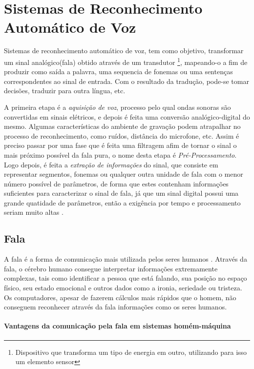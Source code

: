 \chapter{Sistemas de Reconhecimento Automático de Voz}

Sistemas de reconhecimento automático de voz, tem como objetivo, transformar um sinal analógico(fala) obtido através de um transdutor \footnote{Dispositivo que transforma um tipo de energia em outro, utilizando para isso um elemento sensor}, mapeando-o a fim de produzir como saída a palavra, uma sequencia de fonemas ou uma sentenças correspondentes ao sinal de entrada. Com o resultado da tradução, pode-se tomar decisões, traduzir para outra língua, etc.

A primeira etapa é a \textit{aquisição de voz}, processo pelo qual ondas sonoras são convertidas em sinais elétricos, e depois é feita uma conversão analógico-digital do mesmo. Algumas características do ambiente de gravação podem atrapalhar no processo de reconhecimento, como ruídos, distância do microfone, etc. Assim é preciso passar por uma fase que é feita uma filtragem afim de tornar o sinal o mais próximo possível da fala pura, o nome desta etapa é \textit{Pré-Processamento}. Logo depois, é feita a \textit{extração de informações} do sinal, que consiste em representar segmentos, fonemas ou qualquer outra unidade de fala com o menor número possível de parâmetros, de forma que estes contenham informações suficientes para caracterizar o sinal de fala, já que um sinal digital possui uma grande quatidade de parâmetros, então a exigência por tempo e processamento seriam muito altas \cite{RavIsolAnderson}. 

\section{Fala}
A fala é a forma de comunicação mais utilizada pelos seres humanos \cite{RavCorporaCarlos}. Através da fala, o cérebro humano consegue interpretar informações extremamente complexas, tais como identificar a pessoa que está falando, sua posição no espaço físico, seu estado emocional e outros dados como a ironia, seriedade ou tristeza. Os computadores, apesar de fazerem cálculos mais rápidos que o homem, não conseguem reconhecer através da fala informações como os seres humanos.

\subsubsection{Vantagens da comunicação pela fala em sistemas homém-máquina}

